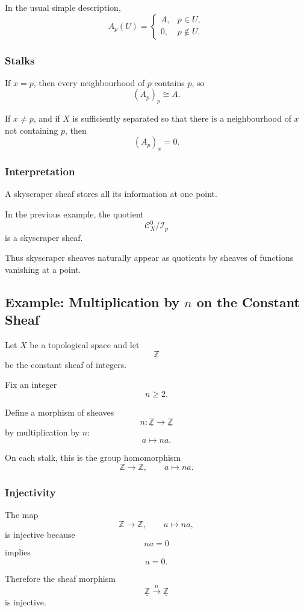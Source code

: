 \documentclass[12pt,a4paper]{article}
\newcommand{\ZZ}{\mathbb{Z}}
\newcommand{\Czero}{\mathcal C^0}        %
\theoremstyle{notespace}
\begin{document}
In the usual simple description,
\[
A_p(U)=
\begin{cases}
	A, & p\in U,\\
	0, & p\notin U.
\end{cases}
\]

\subsubsection*{Stalks}

If \(x=p\), then every neighbourhood of \(p\) contains \(p\), so
\[
(A_p)_p\cong A.
\]

If \(x\neq p\), and if \(X\) is sufficiently separated so that there is a neighbourhood of \(x\) not containing \(p\), then
\[
(A_p)_x=0.
\]

\subsubsection*{Interpretation}

A skyscraper sheaf stores all its information at one point.

In the previous example, the quotient
\[
\Czero_X/\mathcal I_p
\]
is a skyscraper sheaf.

Thus skyscraper sheaves naturally appear as quotients by sheaves of functions vanishing at a point.

\subsection{Example: Multiplication by \(n\) on the Constant Sheaf}

Let \(X\) be a topological space and let
\[
\underline{\ZZ}
\]
be the constant sheaf of integers.

Fix an integer
\[
n\geq 2.
\]

Define a morphism of sheaves
\[
n:\underline{\ZZ}\to \underline{\ZZ}
\]
by multiplication by \(n\):
\[
a\mapsto na.
\]

On each stalk, this is the group homomorphism
\[
\ZZ\to \ZZ,
\qquad
a\mapsto na.
\]

\subsubsection*{Injectivity}

The map
\[
\ZZ\to \ZZ,
\qquad
a\mapsto na,
\]
is injective because
\[
na=0
\]
implies
\[
a=0.
\]

Therefore the sheaf morphism
\[
\underline{\ZZ}\xrightarrow{n}\underline{\ZZ}
\]
is injective.
\end{document}
